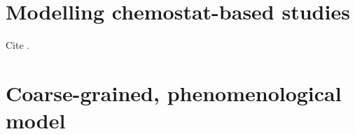 \section{Modelling chemostat-based studies}
\label{sec:model-chemostat}

Cite \textcite{jonesCyberneticModelGrowth1999}.

\section{Coarse-grained, phenomenological model}
\label{sec:model-coarse}

